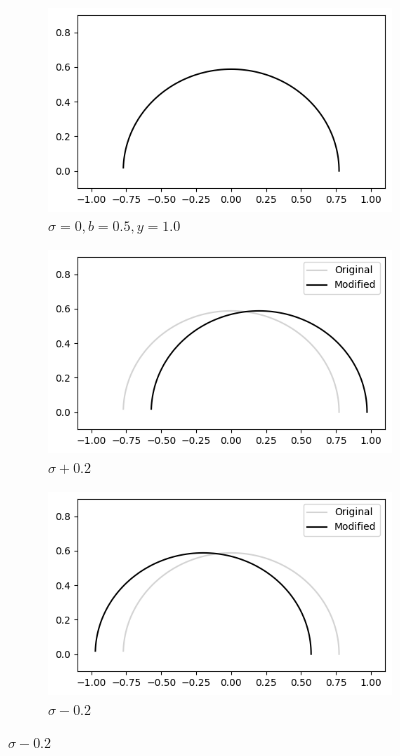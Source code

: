 \documentclass[a4paper]{report}
\begin{document}
\begin{figure}[ht]
    \begin{subfigure}{.3\linewidth}
      \includegraphics[width=\linewidth]{images/deformations/base.png}
      \caption{$\sigma = 0, b = 0.5, y = 1.0$}
      \label{fig:base_deform}
    \end{subfigure}\hfill
    \begin{subfigure}{.3\linewidth}
      \includegraphics[width=\linewidth]{images/deformations/positive_sigma.png}
      \caption{$\sigma + 0.2$}
      \label{fig:positive_sigma}
    \end{subfigure}\hfill
    \begin{subfigure}{.3\linewidth}
      \includegraphics[width=\linewidth]{images/deformations/negative_sigma.png}
      \caption{$\sigma - 0.2$}
        \label{fig:negative_sigma}
    \end{subfigure}


\end{figure}
\end{document}
